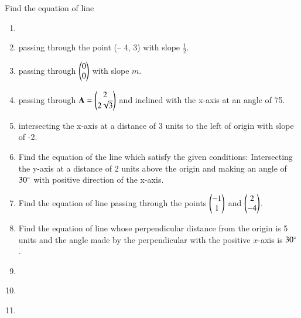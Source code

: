 Find the equation of line 
\begin{enumerate}[label=\thesection.\arabic*,ref=\thesection.\theenumi]

\item 
\label{chapters/11/10/2/1}
\item passing through the point (– 4, 3) with slope $\frac{1}{2}$.
\label{chapters/11/10/2/2}
%
	\item passing through $\begin{pmatrix}0\\0\end{pmatrix}$ with slope $m$.\\
\label{chapters/11/10/2/3}
\solution
%
    \item passing through 
    $\mathbf{A} = \begin{pmatrix}2\\2\sqrt{3}\end{pmatrix}$ and inclined with the x-axis at an angle 
    of 75\textdegree.
\label{chapters/11/10/2/4}
\\
    \solution 
%
\item intersecting the x-axis at a distance of 3 units to the left of origin with slope of -2.
\label{chapters/11/10/2/5}
\\
\solution 
%
\item Find the equation of the line which satisfy the given conditions: Intersecting the y-axis at a distance of 2 units above the origin and making an
angle of $30\degree$ with positive direction of the x-axis.
\\
\solution 
%
\item Find the equation of line passing through the points $\begin{pmatrix}-1\\1\end{pmatrix}$ and $\begin{pmatrix}2\\-4\end{pmatrix}$.
\\
\solution 
%
\item Find the equation of line whose perpendicular distance from the origin is 5 units and the angle made by the perpendicular with the positive $x$-axis is $30\degree$.
\label{chapters/11/10/2/8}
\\
\solution
%
\item 
\label{chapters/11/10/2/9}
%
\item 
\label{chapters/11/10/2/10}
%
\item 

\end{enumerate}
